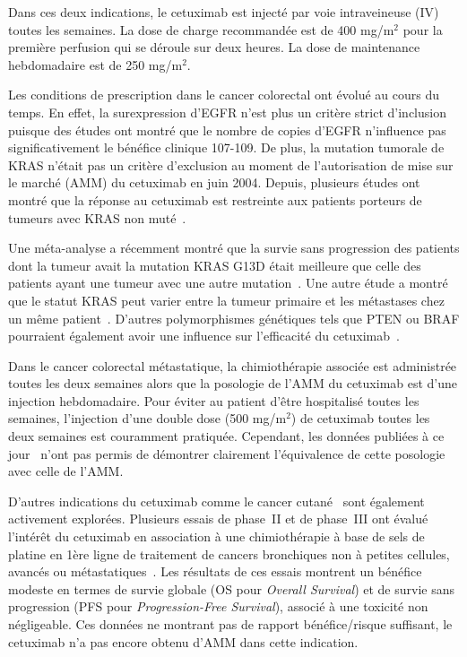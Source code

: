 Dans ces deux indications, le cetuximab est injecté par voie intraveineuse (IV) toutes les semaines. La dose de charge recommandée est de 400 mg/m$^2$ pour la première perfusion qui se déroule sur deux heures. La dose de maintenance hebdomadaire est de 250 mg/m$^2$.

Les conditions de prescription dans le cancer colorectal ont évolué au cours du temps. En effet, la surexpression d'EGFR n'est plus un critère strict d'inclusion puisque des études ont montré que le nombre de copies d'EGFR n'influence pas significativement le bénéfice clinique 107-109. De plus, la mutation tumorale de KRAS n'était pas un critère d'exclusion au moment de l'autorisation de mise sur le marché (AMM) du cetuximab en juin 2004. Depuis, plusieurs études ont montré que la réponse au cetuximab est restreinte aux patients porteurs de tumeurs avec KRAS non muté~\citep{REF110, REF111, REF112, REF113}.

Une méta-analyse a récemment montré que la survie sans progression des patients dont la tumeur avait la mutation KRAS G13D était meilleure que celle des patients ayant une tumeur avec une autre mutation~\citep{REF114}. Une autre étude a montré que le statut KRAS peut varier entre la tumeur primaire et les métastases chez un même patient~\citep{REF115}. D'autres polymorphismes génétiques tels que PTEN ou BRAF pourraient également avoir une influence sur l'efficacité du cetuximab~\citep{REF116, REF117}.

Dans le cancer colorectal métastatique, la chimiothérapie associée est administrée toutes les deux semaines alors que la posologie de l'AMM du cetuximab est d'une injection hebdomadaire. Pour éviter au patient d'être hospitalisé toutes les semaines, l'injection d'une double dose (500 mg/m$^2$) de cetuximab toutes les deux semaines est couramment pratiquée. Cependant, les données publiées à ce jour~\citep{REF118} n'ont pas permis de démontrer clairement l'équivalence de cette posologie avec celle de l'AMM. 

D'autres indications du cetuximab comme le cancer cutané~\citep{REF119} sont également activement explorées. Plusieurs essais de phase~II et de phase~III ont évalué l'intérêt du cetuximab en association à une chimiothérapie à base de sels de platine en 1ère ligne de traitement de cancers bronchiques non à petites cellules, avancés ou métastatiques~\citep{REF120, REF121}. Les résultats de ces essais montrent un bénéfice modeste en termes de survie globale (OS pour \textit{Overall Survival}) et de survie sans progression (PFS pour \textit{Progression-Free Survival}), associé à une toxicité non négligeable. Ces données ne montrant pas de rapport bénéfice/risque suffisant, le cetuximab n'a pas encore obtenu d'AMM dans cette indication.

